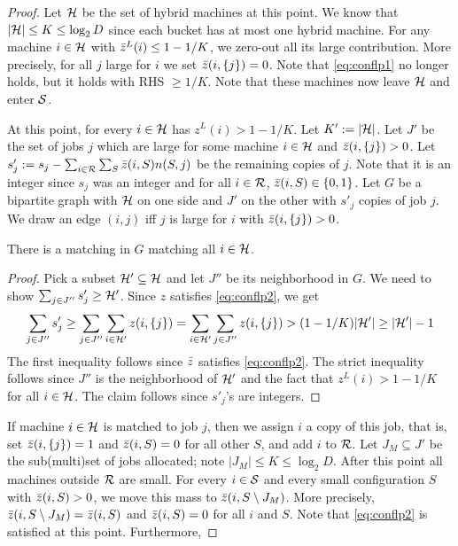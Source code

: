 \begin{proof}

Let ${\cal H}$ be the set of hybrid machines at this point. We know that $|{\cal H}| \leq K \leq \log_2 D$ since each bucket has at most one hybrid machine.
For any machine $i\in {\cal H}$ with $\bar z^L(i) \le 1-1/K$, we zero-out all its large contribution. More precisely, for all $j$ large for $i$ we set $\bar z(i,\{j\})= 0$.
Note that \eqref{eq:conflp1} no longer holds, but it holds with RHS $\geq 1/K$. Note that these machines now leave ${\cal H}$ and enter ${\cal S}$.

At this point, for every $i\in {\cal H}$ has $z^L(i) > 1-1/K$. Let $K' := |{\cal H}|$. Let $J'$ be the set of jobs $j$ which are large for some machine $i\in {\cal H}$ and $\bar z(i,\{j\}) > 0$.
Let $s'_j := s_j - \sum_{i\in {\cal R}} \sum_S \bar z(i,S)n(S,j)$ be the remaining copies of $j$. Note that it is an integer since $s_j$ was an integer and for all $i\in {\cal R}$, $\bar z(i,S) \in \{0,1\}$.
Let $G$ be a bipartite graph with ${\cal H}$ on one side and $J'$ on the other with $s'_j$ copies of job $j$. We draw an edge $(i,j)$ iff $j$ is large for $i$ with $\bar z(i,\{j\}) > 0$.
\begin{claim}
	There is a matching in $G$ matching all $i\in {\cal H}$.
\end{claim}
\begin{proof}
Pick a subset ${\cal H}' \subseteq {\cal H}$ and let $J''$ be its neighborhood in $G$. We need to show $\sum_{j\in J''} s'_j \geq {\cal H}'$.
Since $z$ satisfies \eqref{eq:conflp2}, we get
\[
\sum_{j\in J''} s'_j \geq \sum_{j\in J''} \sum_{i\in {\cal H}'} z(i,\{j\}) = \sum_{i\in {\cal H}'} \sum_{j\in J''} z(i,\{j\})  > (1-1/K)|{\cal H}'| \geq |{\cal H}'| - 1
\]
The first inequality follows since $\bar z$ satisfies \eqref{eq:conflp2}.
The strict inequality follows since $J''$ is the neighborhood of ${\cal H}'$ and the fact that $z^L(i) > 1-1/K$ for all $i\in {\cal H}$.
The claim follows since $s'_j$'s are integers.
\end{proof}
If machine $i\in {\cal H}$ is matched to job $j$, then we assign $i$ a copy of this job, that is,  set $\bar z(i,\{j\}) = 1$ and $\bar z(i,S) = 0$ for all other $S$, 
and add $i$ to ${\cal R}$. Let $J_M \subseteq J'$ be the sub(multi)set of jobs allocated; note $|J_M| \leq K \leq \log_2 D$.
After this point all machines outside ${\cal R}$ are small. For every $i\in {\cal S}$ and every small configuration $S$ with $\bar z(i,S) > 0$, we move this mass to $\bar z(i,S\setminus J_M)$.
More precisely, $\bar z(i,S\setminus J_M) = \bar z(i,S)$ and $\bar z(i,S) = 0$ for all $i$ and $S$. Note that \eqref{eq:conflp2} is satisfied at this point. Furthermore,

\end{proof}
